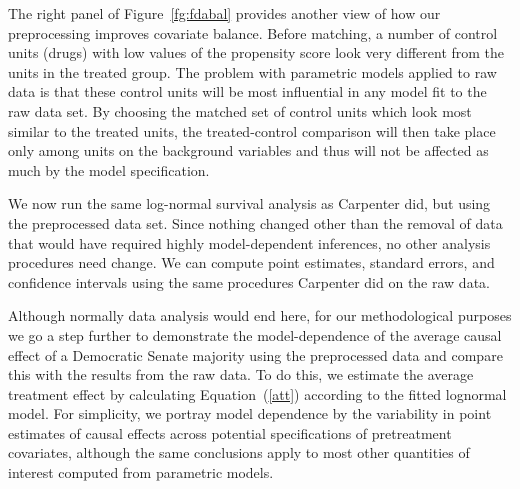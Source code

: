 \documentclass[11pt,titlepage]{article}
\begin{document}
The right panel of Figure~\ref{fg:fdabal} provides another view of how
our preprocessing improves covariate balance.  Before matching, a
number of control units (drugs) with low values of the propensity
score look very different from the units in the treated group.  The
problem with parametric models applied to raw data is that these
control units will be most influential in any model fit to the raw
data set.  By choosing the matched set of control units which look
most similar to the treated units, the treated-control comparison will
then take place only among units on the background variables and thus
will not be affected as much by the model specification.

We now run the same log-normal survival analysis as Carpenter did, but
using the preprocessed data set.  Since nothing changed other than the
removal of data that would have required highly model-dependent
inferences, no other analysis procedures need change.  We can compute
point estimates, standard errors, and confidence intervals using the
same procedures Carpenter did on the raw data.  

Although normally data analysis would end here, for our methodological
purposes we go a step further to demonstrate the model-dependence of
the average causal effect of a Democratic Senate majority using the
preprocessed data and compare this with the results from the raw data.
To do this, we estimate the average treatment effect by calculating
Equation~(\ref{att}) according to the fitted lognormal model.  For
simplicity, we portray model dependence by the variability in point
estimates of causal effects across potential specifications of
pretreatment covariates, although the same conclusions apply to most
other quantities of interest computed from parametric models.
\end{document}

